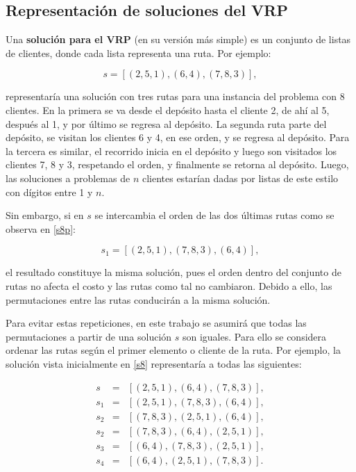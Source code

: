 \subsection{Representación de soluciones del VRP}\label{2-solS}

Una \textbf{solución para el VRP} (en su versión más simple) es un conjunto de listas de clientes, donde cada lista representa una ruta. Por ejemplo:


\begin{equation}
\label{s8}
s = [(2, 5, 1), (6, 4), (7, 8, 3)],
\end{equation}

representaría una solución con tres rutas para una instancia del problema con 8 clientes. En la primera se va desde el depósito hasta el cliente 2, de ahí al 5, después al 1, y por último se regresa al depósito. La segunda ruta parte del depósito, se visitan los clientes 6 y 4, en ese orden, y se regresa al depósito. Para la tercera es similar, el recorrido inicia en el depósito y luego son visitados los clientes 7, 8 y 3, respetando el orden, y finalmente se retorna al depósito. Luego, las soluciones a problemas de $n$ clientes estarían dadas por listas de este estilo con dígitos entre 1 y $n$. 

Sin embargo, si en $s$ se intercambia el orden de las dos últimas rutas como se observa en \ref{s8p}:

\begin{equation}
\label{s8p}
s_1= [(2, 5, 1), (7, 8, 3), (6, 4)],
\end{equation}
 
el resultado constituye la misma solución, pues el orden dentro del conjunto de rutas no afecta el costo y las rutas como tal no cambiaron. Debido a ello, las permutaciones entre las rutas conducirán a la misma solución. 

Para evitar estas repeticiones, en este trabajo se asumirá que todas las permutaciones a partir de una solución $s$ son iguales. Para ello se considera ordenar las rutas según el primer elemento o cliente de la ruta. Por ejemplo, la solución vista inicialmente en \ref{s8} representaría a todas las siguientes:


\begin{eqnarray*}
s &=&  [(2, 5, 1), (6, 4), (7, 8, 3)],\\
s_1 &=& [(2, 5, 1), (7, 8, 3), (6, 4)],\\
s_2 &=& [(7, 8, 3), (2, 5, 1), (6, 4)],\\
s_2 &=& [(7, 8, 3), (6, 4), (2, 5, 1)],\\
s_3 &=& [(6, 4), (7, 8, 3), (2, 5, 1)],\\
s_4 &=& [(6, 4), (2, 5, 1), (7, 8, 3)].\\
\end{eqnarray*}

